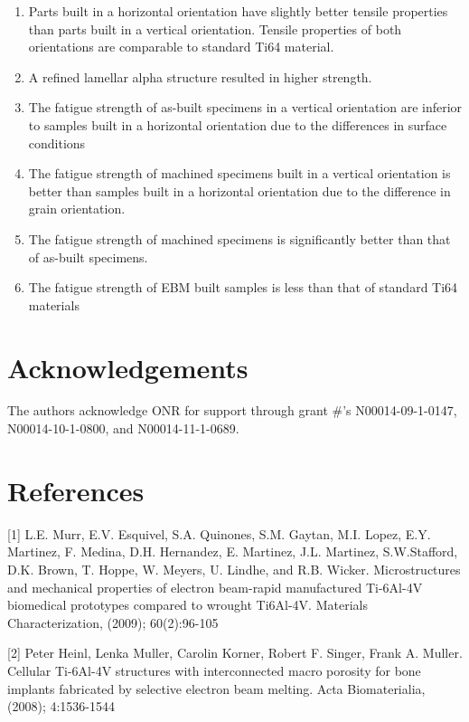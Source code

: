 \documentclass[10pt]{article}
\begin{document}
\begin{enumerate}
  \item Parts built in a horizontal orientation have slightly better tensile properties than parts built in a vertical orientation. Tensile properties of both orientations are comparable to standard Ti64 material.

  \item A refined lamellar alpha structure resulted in higher strength.

  \item The fatigue strength of as-built specimens in a vertical orientation are inferior to samples built in a horizontal orientation due to the differences in surface conditions

  \item The fatigue strength of machined specimens built in a vertical orientation is better than samples built in a horizontal orientation due to the difference in grain orientation.

  \item The fatigue strength of machined specimens is significantly better than that of as-built specimens.

  \item The fatigue strength of EBM built samples is less than that of standard Ti64 materials

\end{enumerate}

\section*{Acknowledgements}
The authors acknowledge ONR for support through grant \#'s N00014-09-1-0147, N00014-10-1-0800, and N00014-11-1-0689.

\section*{References}
[1] L.E. Murr, E.V. Esquivel, S.A. Quinones, S.M. Gaytan, M.I. Lopez, E.Y. Martinez, F. Medina, D.H. Hernandez, E. Martinez, J.L. Martinez, S.W.Stafford, D.K. Brown, T. Hoppe, W. Meyers, U. Lindhe, and R.B. Wicker. Microstructures and mechanical properties of electron beam-rapid manufactured Ti-6Al-4V biomedical prototypes compared to wrought Ti6Al-4V. Materials Characterization, (2009); 60(2):96-105

[2] Peter Heinl, Lenka Muller, Carolin Korner, Robert F. Singer, Frank A. Muller. Cellular Ti-6Al-4V structures with interconnected macro porosity for bone implants fabricated by selective electron beam melting. Acta Biomaterialia, (2008); 4:1536-1544
\end{document}
